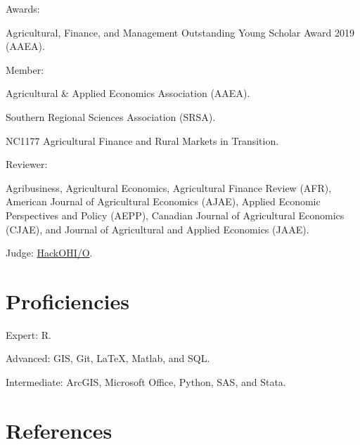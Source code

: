 \documentclass[letterpaper]{article}
\renewenvironment{itemize}{
  \begin{list}{}{
    \setlength{\leftmargin}{1.5em}
  }
}{
  \end{list}
}
\begin{document}
\begin{itemize}
\item Awards:
\begin{itemize}
  \item Agricultural, Finance, and Management Outstanding Young Scholar Award 2019 (AAEA).
  \end{itemize}
\item Member:
  \begin{itemize}
  \item Agricultural \& Applied Economics Association (AAEA).
  \item Southern Regional Sciences Association (SRSA).
  \item NC1177 Agricultural Finance and Rural Markets in Transition.
  \end{itemize}
\item Reviewer:
  \begin{itemize}
  \item Agribusiness, Agricultural Economics, Agricultural Finance Review (AFR), American Journal of Agricultural Economics (AJAE), Applied Economic Perspectives and Policy (AEPP), Canadian Journal of Agricultural Economics (CJAE), and Journal of Agricultural and Applied Economics (JAAE).
  \end{itemize}
\item Judge: \href{http://hack.osu.edu/2016/}{HackOHI/O}.
\end{itemize}


\section*{Proficiencies}

\begin{itemize}
\item Expert: R.
\item Advanced: GIS, Git, \LaTeX, Matlab, and SQL.
\item Intermediate: ArcGIS, Microsoft Office, Python, SAS, and Stata.
\end{itemize}

\newpage

\section*{References}
\end{document}
